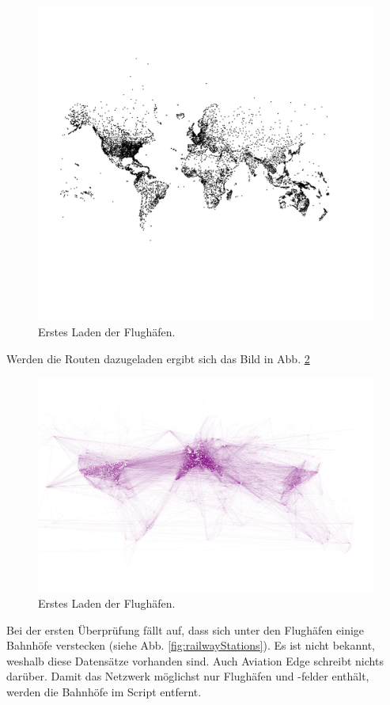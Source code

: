 \begin{figure}[h]
    \centering
    \includegraphics[width=\linewidth]{images/first-load-gephi.png}
    \caption{Erstes Laden der Flughäfen.}
    \label{fig:firstLoadGephi}
\end{figure}

Werden die Routen dazugeladen ergibt sich das Bild in Abb. \ref{fig:firstLoadGephiRoutes}

\begin{figure}
    \centering
    \includegraphics[width=\linewidth]{images/first-load-gephi-routes.png}
    \caption{Erstes Laden der Flughäfen.}
    \label{fig:firstLoadGephiRoutes}
\end{figure}

Bei der ersten Überprüfung fällt auf, dass sich unter den Flughäfen einige Bahnhöfe verstecken (siehe Abb. \ref{fig:railwayStations}).
Es ist nicht bekannt, weshalb diese Datensätze vorhanden sind.
Auch Aviation Edge schreibt nichts darüber.
Damit das Netzwerk möglichst nur Flughäfen und -felder enthält, werden die Bahnhöfe im Script entfernt.
